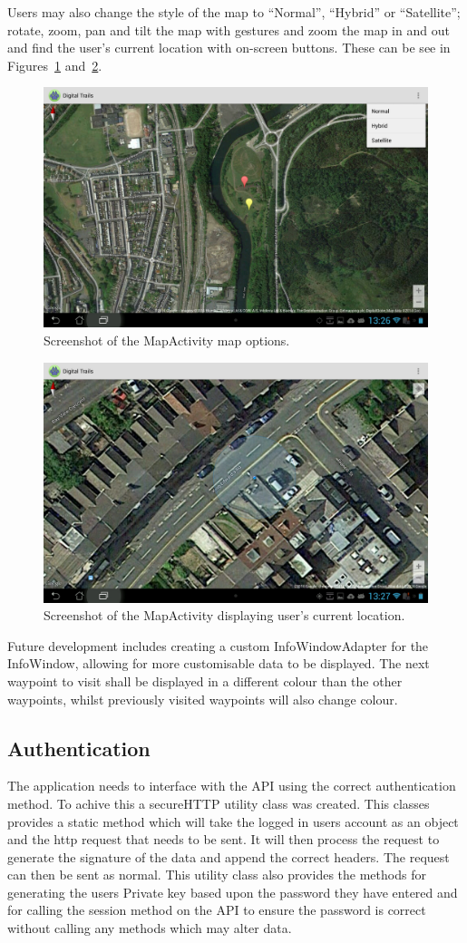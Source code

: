 \documentclass[11pt,a4paper]{article}
\begin{document}
Users may also change the style of the map to ``Normal'', ``Hybrid'' or ``Satellite''; rotate, zoom, pan and tilt the map with gestures and zoom the map in and out and find the user's current location with on-screen buttons. These can be see in Figures~\ref{fig:mapOptions} and~\ref{fig:userLocation}.

\begin{figure}[H]
\centering
\includegraphics[angle=90, width=.6\linewidth]{mapOptions.jpg}
\caption{Screenshot of the MapActivity map options.}
\label{fig:mapOptions}
\end{figure}

\begin{figure}[H]
\centering
\includegraphics[angle=90, width=.6\linewidth]{userLocation.jpg}
\caption{Screenshot of the MapActivity displaying user's current location.}
\label{fig:userLocation}
\end{figure}

Future development includes creating a custom InfoWindowAdapter for the InfoWindow, allowing for more customisable data to be displayed. The next waypoint to visit shall be displayed in a different colour than the other waypoints, whilst previously visited waypoints will also change colour. 


\subsection{Authentication}
\label{sec:authorisation}
The application needs to interface with the API using the correct authentication method. To achive this a secureHTTP utility class was created. This classes provides a static method which will take the logged in users account as an object and the http request that needs to be sent. It will then process the request to generate the signature of the data and append the correct headers. The request can then be sent as normal. This utility class also provides the methods for generating the users Private key based upon the password they have entered and for calling the session method on the API to ensure the password is correct without calling any methods which may alter data. 
\end{document}
